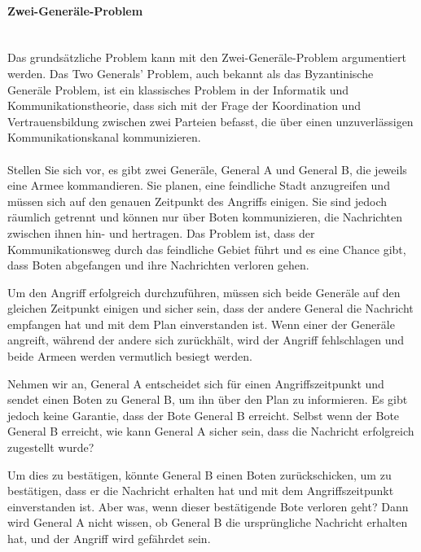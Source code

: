 \paragraph{Zwei-Generäle-Problem \\\\}
Das grundsätzliche Problem kann mit den Zwei-Generäle-Problem argumentiert werden. Das Two Generals' Problem, auch bekannt als das Byzantinische Generäle Problem, ist ein klassisches Problem in der Informatik und Kommunikationstheorie, dass sich mit der Frage der Koordination und Vertrauensbildung zwischen zwei Parteien befasst, die über einen unzuverlässigen Kommunikationskanal kommunizieren.
\\\\
Stellen Sie sich vor, es gibt zwei Generäle, General A und General B, die jeweils eine Armee kommandieren. Sie planen, eine feindliche Stadt anzugreifen und müssen sich auf den genauen Zeitpunkt des Angriffs einigen. Sie sind jedoch räumlich getrennt und können nur über Boten kommunizieren, die Nachrichten zwischen ihnen hin- und hertragen. Das Problem ist, dass der Kommunikationsweg durch das feindliche Gebiet führt und es eine Chance gibt, dass Boten abgefangen und ihre Nachrichten verloren gehen.

Um den Angriff erfolgreich durchzuführen, müssen sich beide Generäle auf den gleichen Zeitpunkt einigen und sicher sein, dass der andere General die Nachricht empfangen hat und mit dem Plan einverstanden ist. Wenn einer der Generäle angreift, während der andere sich zurückhält, wird der Angriff fehlschlagen und beide Armeen werden vermutlich besiegt werden.

Nehmen wir an, General A entscheidet sich für einen Angriffszeitpunkt und sendet einen Boten zu General B, um ihn über den Plan zu informieren. Es gibt jedoch keine Garantie, dass der Bote General B erreicht. Selbst wenn der Bote General B erreicht, wie kann General A sicher sein, dass die Nachricht erfolgreich zugestellt wurde?

Um dies zu bestätigen, könnte General B einen Boten zurückschicken, um zu bestätigen, dass er die Nachricht erhalten hat und mit dem Angriffszeitpunkt einverstanden ist. Aber was, wenn dieser bestätigende Bote verloren geht? Dann wird General A nicht wissen, ob General B die ursprüngliche Nachricht erhalten hat, und der Angriff wird gefährdet sein.

